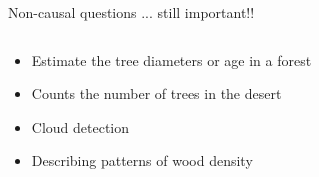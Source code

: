 \documentclass{beamer}
\begin{document}
\begin{frame}{Non-causal questions ... still important!!}
  \begin{columns}
    \begin{column}{0.5\textwidth}
      \begin{itemize}[<+-|alert@+>]
	\item Estimate the tree diameters or age in a forest \citep{west2021tamm} 
	\item Counts the number of trees in the desert
	  \citep[\href{https://www.nature.com/articles/s41586-020-2824-5}{unexpectedly high}][]{brandt2020unexpectedly} 
	\item Cloud detection \citep{aybar2024onboard} 
	\item Describing patterns of wood density \citep{yang2024} 
      \end{itemize}
    \end{column}
    \begin{column}{0.5\textwidth}
\end{column}
\end{columns}
\end{frame}
\end{document}

